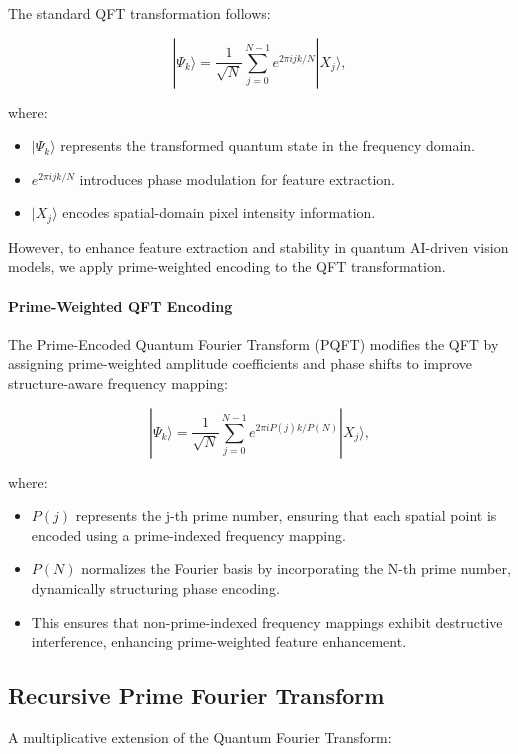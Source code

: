 \documentclass{article}
\theoremstyle{plain}
\begin{document}
The standard QFT transformation follows:

\begin{equation}
|\Psi_k\rangle = \frac{1}{\sqrt{N}} \sum_{j=0}^{N-1} e^{2\pi i jk / N} |X_j\rangle,
\end{equation}

where:
\begin{itemize}
    \item $|\Psi_k\rangle$ represents the transformed quantum state in the frequency domain.
    \item $e^{2\pi i jk / N}$ introduces phase modulation for feature extraction.
    \item $|X_j\rangle$ encodes spatial-domain pixel intensity information.
\end{itemize}

However, to enhance feature extraction and stability in quantum AI-driven vision models, we apply prime-weighted encoding to the QFT transformation.

\paragraph{Prime-Weighted QFT Encoding}

The Prime-Encoded Quantum Fourier Transform (PQFT) modifies the QFT by assigning prime-weighted amplitude coefficients and phase shifts to improve structure-aware frequency mapping:

\begin{equation}
|\Psi_k\rangle = \frac{1}{\sqrt{N}} \sum_{j=0}^{N-1} e^{2\pi i P(j)k / P(N)} |X_j\rangle,
\end{equation}

where:
\begin{itemize}
    \item $P(j)$ represents the j-th prime number, ensuring that each spatial point is encoded using a prime-indexed frequency mapping.
    \item $P(N)$ normalizes the Fourier basis by incorporating the N-th prime number, dynamically structuring phase encoding.
    \item This ensures that non-prime-indexed frequency mappings exhibit destructive interference, enhancing prime-weighted feature enhancement.
\end{itemize}

\subsection{Recursive Prime Fourier Transform}
A multiplicative extension of the Quantum Fourier Transform:
\end{document}
